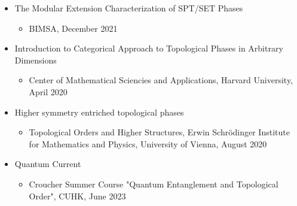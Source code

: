 \documentclass[hidelinks,a4paper]{article}
\begin{document}
\begin{itemize}
  \begin{itemize}\tiny
    \item Department of Physics, Tsinghua University, May 2018
    \item Séminaire de mathématiques supérieures (SMS) 2018, Fields Institute for Research in Mathematical Sciences, June 2018
    \item Quantum Information and Operator Algebras III, Academy of Mathematics and Systems Science, Chinese Academy of Sciences, July 2018
    \item Department of Physics, Sun Yat-Sen University, July 2019
    \item QuIST V: The 5th International Conference on Quantum Information,
      Space-time, and Topological order, Kunming, China, August 2019
      \item 	Department of Physics, Southern University of Science and Technology, August 2019
    \item The Chinese University of Hong Kong, October 2020
    \item CMSA, Harvard University, June 2021
    \item BIMSA, March 2022
  \end{itemize}
  \item The Modular Extension Characterization of SPT/SET Phases~\supercite{LKW1507.04673,LKW1602.05936,LKW1602.05946}
  \begin{itemize}\tiny
    \item BIMSA, December 2021
  \end{itemize}
  \item Introduction to Categorical Approach to Topological Phases in Arbitrary Dimensions
  \begin{itemize}\tiny
     \item Center of Mathematical Sciencies and Applications, Harvard University, April 2020
  \end{itemize}
  \item Higher symmetry entriched topological phases~\supercite{KLW+2003.08898,KLW+2005.14178}
  \begin{itemize}\tiny
     \item  Topological Orders and Higher Structures, Erwin Schrödinger Institute for Mathematics and Physics, University of Vienna, August 2020
  \end{itemize}
  \item Quantum Current~\supercite{LZ2305.12917}
  \begin{itemize}\tiny
     \item  Croucher Summer Course "Quantum Entanglement and Topological Order", CUHK, June 2023

\end{itemize}
\end{itemize}
\end{document}
